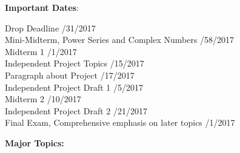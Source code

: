 \documentclass[12pt]{article}
\begin{document}
\noindent\textbf{Important Dates}:
\begin{center} \begin{minipage}{5in}
\begin{flushleft}
Drop Deadline /31/2017\\
Mini-Midterm, Power Series and Complex Numbers /58/2017\\
Midterm 1 /1/2017\\
Independent Project Topics /15/2017\\
Paragraph about Project /17/2017\\
Independent Project Draft 1 /5/2017\\
Midterm 2 /10/2017\\
Independent Project Draft 2 /21/2017\\
Final Exam, Comprehensive emphasis on later topics /1/2017\\
\end{flushleft}
\end{minipage}
\end{center}


\noindent \textbf{Major Topics:} 
\end{document}
